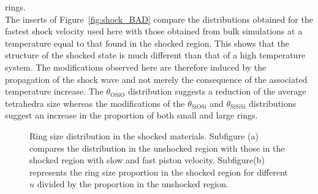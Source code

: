 \documentclass[aps,10pt,twocolumn]{revtex4}
\newcommand{\mrm}[1]{\ensuremath{\mathrm{#1}}\xspace}
\newlength{\picW}	%
\newcommand{\picA}{270}	%
\newcommand{\picL}[1]{\texttt{[image: \#1]}}
\begin{document}
rings.\\
The inserts of Figure~\ref{fig:shock_BAD} compare the distributions obtained for the fastest
shock velocity used here with those obtained from bulk simulations at a temperature equal to that found in
the shocked region. This shows that the structure of the shocked state
is much different than that of a high temperature system. The modifications observed here
are therefore induced by the propagation of the shock wave and not merely the consequence of the
associated temperature increase. The $\theta_\mrm{OSiO}$ distribution suggests a reduction of the average tetrahedra
size  whereas the modifications of the $\theta_\mrm{SiOSi}$ and $\theta_\mrm{SiSiSi}$
distributions suggest an increase in the proportion of both small and large rings.\\

\picW=8cm
\begin{figure}
\subfigure[]{\picL{fig07a.ps}}
\subfigure[]{\picL{fig07b.ps}}
\caption{Ring size distribution in the shocked materials. Subfigure (a) compares the
distribution in the unshocked region with those in the shocked region with slow and fast piston
velocity. Subfigure(b) represents the ring size proportion in the shocked 
region for different $u$ divided by the proportion in the unshocked region.}
\label{fig:shock_rings}
\end{figure}
\end{document}
